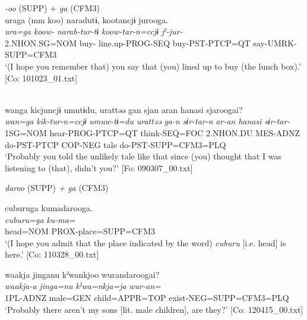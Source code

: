 \ea\label{ex:10.47}   
 \begin{xlist}
 \exi{} \textit{{}-oo} (SUPP) + \textit{ga} (CFM3)\\
  \ex  %
      \glll    uraga  (mm  koo)  naradutɨ,  kootancjɨ    jurooga.\\
      \textit{ura=ga}    \textit{koow-}  \textit{narab-tur-tɨ}  \textit{koow-tar-n=ccjɨ}  \textit{jˀ-jur-}\\
      2.NHON.SG=NOM    buy-  line.up-PROG-SEQ  buy-PST-PTCP=QT  say-UMRK-SUPP=CFM3\\
      \glt       ‘(I hope you remember that) you say that (you) lined up to buy (the lunch box).’ [Co: 101023\_01.txt]

  \ex\relax  [= (8-41)]\\
      \glll    wanga  kicjuncjɨ  umutɨdu,  urattəə   gan  sjan  aran  hanasi  sjaroogai?\\
      \textit{wan=ga}  \textit{kik-tur-n=ccjɨ}  \textit{umuw-tɨ=du}  \textit{urattəə}   \textit{ga-n}  \textit{sɨr-tar-n}  \textit{ar-an}  \textit{hanasi}  \textit{sɨr-tar-}\\
      1SG=NOM  hear-PROG-PTCP=QT  think-SEQ=FOC  2.NHON.DU  MES-ADNZ  do-PST-PTCP  COP-NEG  tale  do-PST-SUPP=CFM3=PLQ\\
      \glt       ‘Probably you told the unlikely tale like that since (you) thought that I was listening to (that), didn’t you?’ [Fo: 090307\_00.txt]

  \exi{} \textit{daroo} (SUPP) \textit{+} \textit{ga} (CFM3)

  \ex  %
      \glll    cuburuga  kumadarooga.\\
      \textit{cuburu=ga}  \textit{ku-ma=}\\
      head=NOM  PROX-place=SUPP=CFM3\\
      \glt       ‘(I hope you admit that the place indicated by the word) \textit{cuburu} [i.e. head] is here.’ [Co: 110328\_00.txt]

  \ex  %
      \glll    waakja  jinganu  kˀwankjoo  wurandaroogai?\\
      \textit{waakja-a}  \textit{jinga=nu}  \textit{kˀwa=nkja=ja}  \textit{wur-an=}\\
      1PL-ADNZ  male=GEN  child=APPR=TOP  exist-NEG=SUPP=CFM3=PLQ\\
      \glt       ‘Probably there aren’t my sons [lit. male children], are they?’ [Co: 120415\_00.txt]
    \end{xlist}
\z

